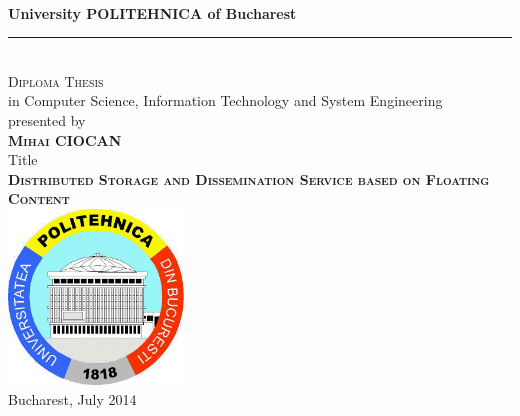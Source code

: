 \begin{titlepage}
\begin{center}

~\\[5mm]
{\Large {\bf University POLITEHNICA of Bucharest}}\\[5mm]
\smallskip\hrule\smallskip
~\\[15mm]

{\Large \textsc{Diploma Thesis}} \\[15mm]

{\large in Computer Science, Information Technology and System Engineering} \\[20mm]

{\large presented by} \\[2mm]

{\Large \textsc{{\bf Mihai CIOCAN}}} \\[20mm]

{\large Title} \\[2mm]
{\Large \textsc{{\bf Distributed Storage and Dissemination Service based on
Floating Content}}}
\\[25mm]

\centering
{\includegraphics[width=0.35\textwidth]{./img/upb}}\\[5mm]

{\large Bucharest, July 2014}


\end{center}
\end{titlepage}
